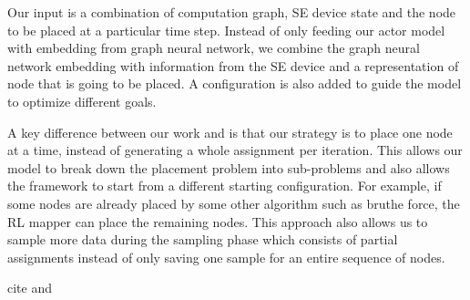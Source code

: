 Our input is a combination of computation graph, SE device state and the node to be placed at a particular time step. 
Instead of only feeding our actor model with embedding from graph neural network, we combine the graph neural network embedding with information from the SE device and a representation of node that is going to be placed. 
A configuration is also added to guide the model to optimize different goals.

A key difference between our work and \cite{zhou2019gdp} is that our strategy is to place one node at a time, instead of generating a whole assignment per iteration. 
This allows our model to break down the placement problem into sub-problems and also allows the framework to start from a different starting configuration. 
For example, if some nodes are already placed by some other algorithm such as bruthe force, the RL mapper can place the remaining nodes. 
This approach also allows us to sample more data during the sampling phase which consists of partial assignments instead of only saving one sample for an entire sequence of nodes.  

cite \cite{khailany_accelerating_2020} and \cite{wu_core_2020} 